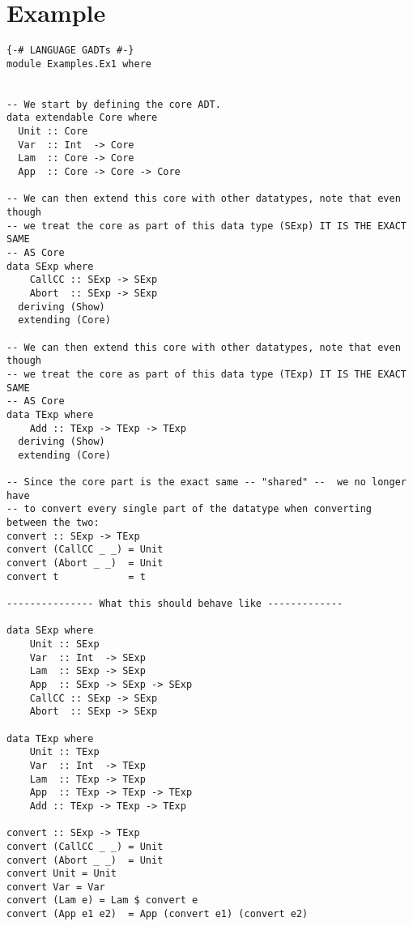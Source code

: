 \section{Example}
\label{sec:example}
\begin{lstlisting}
{-# LANGUAGE GADTs #-}
module Examples.Ex1 where


-- We start by defining the core ADT.
data extendable Core where
  Unit :: Core
  Var  :: Int  -> Core
  Lam  :: Core -> Core
  App  :: Core -> Core -> Core

-- We can then extend this core with other datatypes, note that even though
-- we treat the core as part of this data type (SExp) IT IS THE EXACT SAME
-- AS Core
data SExp where
    CallCC :: SExp -> SExp
    Abort  :: SExp -> SExp
  deriving (Show)  
  extending (Core)

-- We can then extend this core with other datatypes, note that even though
-- we treat the core as part of this data type (TExp) IT IS THE EXACT SAME
-- AS Core
data TExp where
    Add :: TExp -> TExp -> TExp
  deriving (Show)  
  extending (Core)

-- Since the core part is the exact same -- "shared" --  we no longer have
-- to convert every single part of the datatype when converting between the two:
convert :: SExp -> TExp
convert (CallCC _ _) = Unit
convert (Abort _ _)  = Unit
convert t            = t

--------------- What this should behave like -------------

data SExp where
    Unit :: SExp
    Var  :: Int  -> SExp
    Lam  :: SExp -> SExp
    App  :: SExp -> SExp -> SExp
    CallCC :: SExp -> SExp
    Abort  :: SExp -> SExp

data TExp where
    Unit :: TExp
    Var  :: Int  -> TExp
    Lam  :: TExp -> TExp
    App  :: TExp -> TExp -> TExp
    Add :: TExp -> TExp -> TExp

convert :: SExp -> TExp
convert (CallCC _ _) = Unit
convert (Abort _ _)  = Unit
convert Unit = Unit
convert Var = Var
convert (Lam e) = Lam $ convert e
convert (App e1 e2)  = App (convert e1) (convert e2)
\end{lstlisting}



